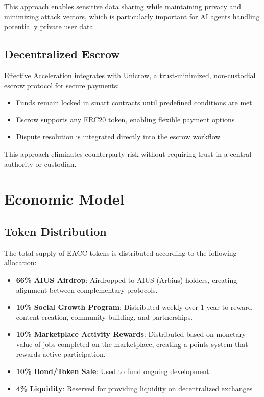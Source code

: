 \documentclass{article}
\begin{document}
This approach enables sensitive data sharing while maintaining privacy and minimizing attack vectors, which is particularly important for AI agents handling potentially private user data.

\subsection{Decentralized Escrow}

Effective Acceleration integrates with Unicrow\cite{unicrow}, a trust-minimized, non-custodial escrow protocol for secure payments:

\begin{itemize}
    \item Funds remain locked in smart contracts until predefined conditions are met
    \item Escrow supports any ERC20 token, enabling flexible payment options
    \item Dispute resolution is integrated directly into the escrow workflow
\end{itemize}

This approach eliminates counterparty risk without requiring trust in a central authority or custodian.

\section{Economic Model}

\subsection{Token Distribution}

The total supply of EACC tokens is distributed according to the following allocation:

\begin{itemize}
    \item \textbf{66\% AIUS Airdrop}: Airdropped to AIUS (Arbius) holders, creating alignment between complementary protocols.

    \item \textbf{10\% Social Growth Program}: Distributed weekly over 1 year to reward content creation, community building, and partnerships.
    
    \item \textbf{10\% Marketplace Activity Rewards}: Distributed based on monetary value of jobs completed on the marketplace, creating a points system that rewards active participation.

    \item \textbf{10\% Bond/Token Sale}: Used to fund ongoing development.

    \item \textbf{4\% Liquidity}: Reserved for providing liquidity on decentralized exchanges
    
\end{itemize}
\end{document}
